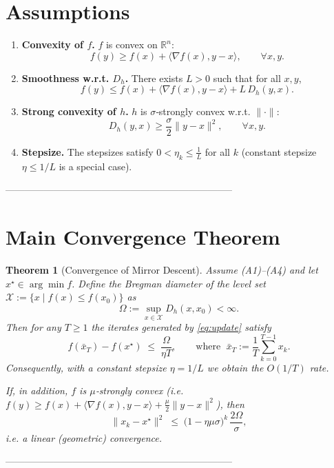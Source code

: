\documentclass{article}
\newtheorem{theorem}{Theorem}
\newcommand{\R}{\mathbb{R}}
\newcommand{\inner}[2]{\langle #1,#2\rangle}
\newcommand{\D}[2]{D_{h}(#1,#2)}
\newcommand{\grad}{\nabla}
\begin{document}
\section*{Assumptions}
\begin{enumerate}
\item[(A1)] \textbf{Convexity of $f$.}  
      $f$ is convex on $\R^{n}$:
      \[
      f(y)\ge f(x)+\inner{\grad f(x)}{y-x},\qquad\forall x,y.
      \]

\item[(A2)] \textbf{Smoothness w.r.t. $D_h$.}  
      There exists $L>0$ such that for all $x,y$,
      \[
      f(y)\le f(x)+\inner{\grad f(x)}{y-x}+L\,\D{y}{x}. \tag{1}
      \]

\item[(A3)] \textbf{Strong convexity of $h$.}  
      $h$ is $\sigma$‑strongly convex w.r.t. $\|\cdot\|$:
      \[
      \D{y}{x}\ge\frac{\sigma}{2}\|y-x\|^{2},\qquad\forall x,y. \tag{2}
      \]

\item[(A4)] \textbf{Stepsize.}  
      The stepsizes satisfy $0<\eta_k\le \frac{1}{L}$ for all $k$ (constant stepsize $\eta\le 1/L$ is a special case).
\end{enumerate}

-----------------------------------------------------------------------

\section*{Main Convergence Theorem}
\begin{theorem}[Convergence of Mirror Descent]\label{thm:conv}
Assume (A1)–(A4) and let $x^{\star}\in\arg\min f$.  
Define the Bregman diameter of the level set $\mathcal{X}:=\{x\mid f(x)\le f(x_{0})\}$ as
\[
\Omega:=\sup_{x\in\mathcal{X}}\D{x}{x_{0}}<\infty.
\]
Then for any $T\ge1$ the iterates generated by \eqref{eq:update} satisfy
\[
f(\bar x_T)-f(x^{\star})\;\le\;\frac{\Omega}{\eta T},
\qquad\text{where }\;\bar x_T:=\frac1T\sum_{k=0}^{T-1}x_k.
\tag{3}
\]
Consequently, with a constant stepsize $\eta=1/L$ we obtain the $O(1/T)$ rate.

If, in addition, $f$ is $\mu$‑strongly convex (i.e. $f(y)\ge f(x)+\inner{\grad f(x)}{y-x}+\frac{\mu}{2}\|y-x\|^{2}$), then
\[
\|x_{k}-x^{\star}\|^{2}\;\le\;\Big(1-\eta\mu\sigma\Big)^{k}\,\frac{2\Omega}{\sigma},
\tag{4}
\]
i.e. a linear (geometric) convergence.
\end{theorem}

-----------------------------------------------------------------------
\end{document}

